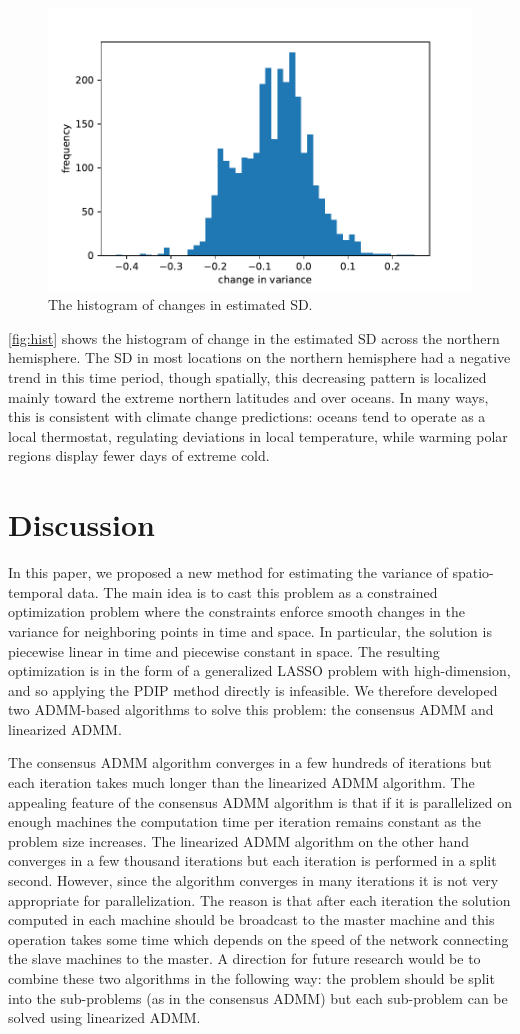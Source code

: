\documentclass{article}
\begin{document}
\begin{figure}[tb]
  \centering
  \includegraphics[width=.3\linewidth]{Figures/hist_avg_change.pdf}
  \caption{The histogram of changes in estimated SD.}
  \label{fig:hist}
\end{figure}

\autoref{fig:hist} shows the
histogram of change in the estimated SD across the northern
hemisphere. The SD in most locations on the northern
hemisphere had a negative trend in this time period, though spatially,
this decreasing pattern is localized mainly toward the extreme
northern latitudes and over oceans. In many ways, this is consistent
with climate change predictions: oceans tend to operate as a local
thermostat, regulating deviations in local temperature, while warming polar
regions display fewer days of extreme cold.



 

\section{Discussion}
In this paper, we proposed a new method for estimating the variance of
spatio-temporal data. The main idea is to cast this problem as a
constrained optimization problem where the constraints enforce smooth
changes in the variance for neighboring points in time and space. In
particular, the solution is piecewise linear in time and piecewise
constant in space. The resulting optimization is in the form of a
generalized LASSO problem with high-dimension, and so applying the
PDIP method directly is infeasible. We therefore developed two
ADMM-based algorithms to solve this problem: the consensus ADMM and
linearized ADMM. 

The consensus ADMM algorithm converges in a few hundreds of iterations
but each iteration takes much longer than the linearized ADMM
algorithm. The appealing feature of the consensus ADMM algorithm is
that if it is parallelized on enough machines the
computation time per iteration remains constant as the problem size
increases. The linearized ADMM algorithm on the other hand converges
in a few thousand iterations but each iteration is performed in a
split second. However, since the algorithm converges in many
iterations it is not very appropriate for parallelization. The reason
is that after each iteration the solution computed in each machine
should be broadcast to the master machine and this operation takes
some time which depends on the speed of the network connecting the
slave machines to the master. A direction for future research would be
to combine these two algorithms in the following way: the problem
should be split into the sub-problems (as in the consensus ADMM) but
each sub-problem can be solved using linearized ADMM. 
\end{document}
